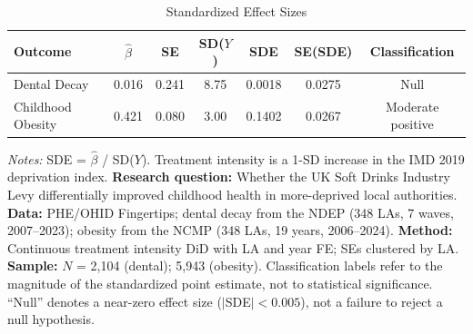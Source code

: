 \begin{table}[t]
\centering
\caption{Standardized Effect Sizes}
\label{tab:sde}
\begin{tabular}{lcccccc}
\toprule
Outcome & $\hat{\beta}$ & SE & SD($Y$) & SDE & SE(SDE) & Classification \\
\midrule
Dental Decay & 0.016 & 0.241 & 8.75 & 0.0018 & 0.0275 & Null \\
Childhood Obesity & 0.421 & 0.080 & 3.00 & 0.1402 & 0.0267 & Moderate positive \\
\bottomrule
\end{tabular}
\par\vspace{0.3em}
{\footnotesize \textit{Notes:} SDE = $\hat{\beta}$ / SD($Y$). Treatment intensity is a 1-SD increase in the IMD 2019 deprivation index. \textbf{Research question:} Whether the UK Soft Drinks Industry Levy differentially improved childhood health in more-deprived local authorities. \textbf{Data:} PHE/OHID Fingertips; dental decay from the NDEP (348 LAs, 7 waves, 2007--2023); obesity from the NCMP (348 LAs, 19 years, 2006--2024). \textbf{Method:} Continuous treatment intensity DiD with LA and year FE; SEs clustered by LA. \textbf{Sample:} $N$ = 2,104 (dental); 5,943 (obesity). Classification labels refer to the magnitude of the standardized point estimate, not to statistical significance. ``Null'' denotes a near-zero effect size ($|$SDE$| < 0.005$), not a failure to reject a null hypothesis.}
\end{table}

